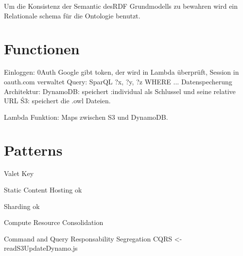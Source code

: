 \documentclass[
12pt,
english,
ngerman,
headsepline,
twoside,
openright,
numbers=noenddot,version=first
]{scrreprt}
\begin{document}
Um die Konsistenz der Semantic desRDF Grundmodells zu bewahren wird ein Relationale schema für die Ontologie benutzt.






\section{Functionen}

Einloggen: 0Auth Google gibt token, der wird in Lambda überprüft, Session in oauth.com verwaltet
Query: SparQL ?x, ?y, ?z WHERE ...
Datenspecherung Architektur:
DynamoDB: speichert :individual als Schlussel und seine relative URL
Ś3: speichert die .owl Dateien.

Lambda Funktion: Maps zwischen S3 und DynamoDB.

\section{Patterns}
Valet Key

Static Content Hosting ok

Sharding ok

Compute Resource Consolidation 

Command and Query Responsability Segregation CQRS <- readS3UpdateDynamo.js
\end{document}
